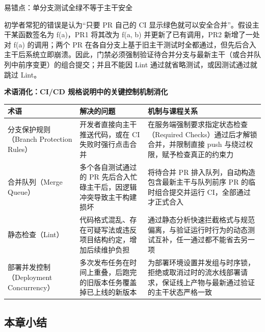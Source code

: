 \documentclass[UTF8,a4paper,11pt,fontset=fandol]{ctexart}
\begin{document}
\begin{warningbox}{易错点：单分支测试全绿不等于主干安全}

初学者常犯的错误是认为“只要 PR 自己的 CI 显示绿色就可以安全合并”。假设主干某函数签名为 f(a)，PR1 将其改为 f(a, b) 并更新了已有调用，PR2 新增了一处对 f(a) 的调用；两个 PR 在各自分支上基于旧主干测试时全都通过，但先后合入主干后系统立即崩溃。因此，门禁必须强制验证待合并分支与最新主干（或合并队列中前序变更）的组合提交；并且不能因 Lint 通过就省略测试，或因测试通过就跳过 Lint。

\end{warningbox}

\par{}\textbf{术语消化：CI/CD 规格说明中的关键控制机制消化}

\begin{center}\small\begin{tabularx}{\linewidth}{YYY}

\toprule

术语 & 解决的问题 & 机制与课程关系\\\midrule

分支保护规则（Branch Protection Rules） & 开发者直接向主干推送代码，或在 CI 失败时强行点击合并 & 在服务端强制要求指定状态检查（Required Checks）通过后才解锁合并，并限制直接 push 与绕过权限，赋予检查真正的约束力\\[3pt]

合并队列（Merge Queue） & 多个各自测试通过的 PR 先后合入忙碌主干后，因逻辑冲突导致主干构建损坏 & 将待合并 PR 排入队列，自动构造包含最新主干与队列前序 PR 的临时组合提交并运行 CI，全部通过才正式合入\\[3pt]

静态检查（Lint） & 代码格式混乱、存在可疑写法或违反项目结构约定，增加后续维护负担 & 通过静态分析快速拦截格式与规范偏离，与验证运行时行为的动态测试互补，任一通过都不能省去另一项\\[3pt]

部署并发控制（Deployment Concurrency） & 多次发布任务在时间上重叠，后跑完的旧版本任务覆盖掉已上线的新版本 & 为部署环境设置并发组与时序锁，拒绝或取消过时的流水线部署请求，保证线上产物与最新通过验证的主干状态严格一致\\[3pt]

\bottomrule\end{tabularx}\end{center}

\subsection{本章小结}
\end{document}
